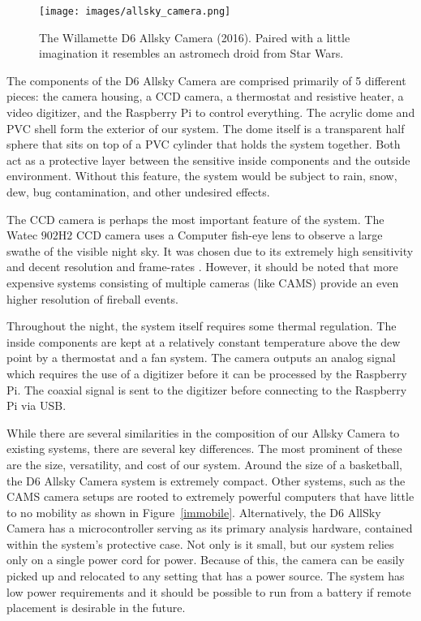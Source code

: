 \begin{figure}[ht!]
  \centering
  \texttt{[image: images/allsky\_camera.png]}
  \caption{The Willamette D6 Allsky Camera (2016). Paired with a little imagination it resembles an astromech droid from Star Wars.}
  \label{droid}
\end{figure}


The components of the D6 Allsky Camera are comprised primarily of 5 different pieces: the camera housing, a CCD camera, a thermostat and resistive heater, a video digitizer, and the Raspberry Pi to control everything.
The acrylic dome and PVC shell form the exterior of our system. 
The dome itself is a transparent half sphere that sits on top of a PVC cylinder that holds the system together.
Both act as a protective layer between the sensitive inside components and the outside environment.  
Without this feature, the system would be subject to rain, snow, dew, bug contamination, and other undesired effects.

The CCD camera is perhaps the most important feature of the system.
The Watec $902$H$2$ CCD camera uses a Computer fish-eye lens to observe a large swathe of the visible night sky.
It was chosen due to its extremely high sensitivity and decent resolution and frame-rates \cite{noauthor_wat-902h2_nodate}.
However, it should be noted that more expensive systems consisting of multiple cameras (like CAMS) provide an even higher resolution of fireball events.

Throughout the night, the system itself requires some thermal regulation.
The inside components are kept at a relatively constant temperature above the dew point by a thermostat and a fan system.
The camera outputs an analog signal which requires the use of a digitizer before it can be processed by the Raspberry Pi.
The coaxial signal is sent to the digitizer before connecting to the Raspberry Pi via USB.

While there are several similarities in the composition of our Allsky Camera to existing systems, there are several key differences.
The most prominent of these are the size, versatility, and cost of our system.
Around the size of a basketball, the D6 Allsky Camera system is extremely compact.
Other systems, such as the CAMS camera setups are rooted to extremely powerful computers that have little to no mobility as shown in Figure~\ref{immobile}.
Alternatively, the D6 AllSky Camera has a microcontroller serving as its primary analysis hardware, contained within the system's protective case.
Not only is it small, but our system relies only on a single power cord for power.  
Because of this, the camera can be easily picked up and relocated to any setting that has a power source.  
The system has low power requirements and it should be possible to run from a battery if remote placement is desirable in the future.

